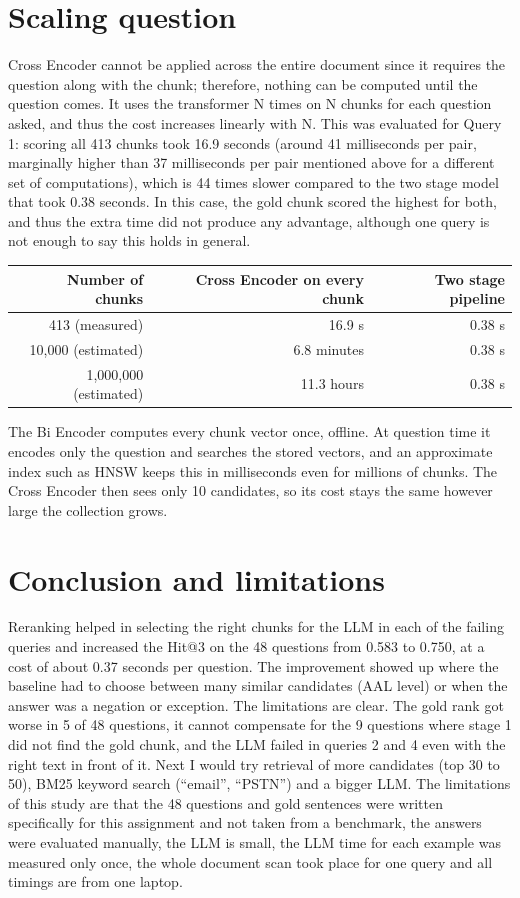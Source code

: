 \documentclass[11pt,a4paper]{article}
\begin{document}
\section{Scaling question}

Cross Encoder cannot be applied across the entire document since it requires the question along with the chunk; therefore, nothing can be computed until the question comes. It uses the transformer N times on N chunks for each question asked, and thus the cost increases linearly with N. This was evaluated for Query 1: scoring all 413 chunks took 16.9 seconds (around 41 milliseconds per pair, marginally higher than 37 milliseconds per pair mentioned above for a different set of computations), which is 44 times slower compared to the two stage model that took 0.38 seconds. In this case, the gold chunk scored the highest for both, and thus the extra time did not produce any advantage, although one query is not enough to say this holds in general.

\begin{center}
\small
\begin{tabular}{@{}rrr@{}}
\toprule
Number of chunks & Cross Encoder on every chunk & Two stage pipeline \\
\midrule
413 (measured) & 16.9 s & 0.38 s \\
10,000 (estimated) & 6.8 minutes & 0.38 s \\
1,000,000 (estimated) & 11.3 hours & 0.38 s \\
\bottomrule
\end{tabular}
\end{center}

The Bi Encoder computes every chunk vector once, offline. At question time it encodes only the question and searches the stored vectors, and an approximate index such as HNSW keeps this in milliseconds even for millions of chunks. The Cross Encoder then sees only 10 candidates, so its cost stays the same however large the collection grows.

\section{Conclusion and limitations}

Reranking helped in selecting the right chunks for the LLM in each of the failing queries and increased the Hit@3 on the
48 questions from 0.583 to 0.750, at a cost of about 0.37 seconds per question. The improvement showed up where the
baseline had to choose between many similar candidates (AAL level) or when the answer was a negation or exception. The limitations are clear. The gold rank got worse in 5 of 48 questions, it cannot compensate for the 9 questions where stage 1 did
not find the gold chunk, and the LLM failed in queries 2 and 4 even with the right text in front of it. Next I would try
retrieval of more candidates (top 30 to 50), BM25 keyword search (``email'', ``PSTN'') and a bigger LLM.
The limitations of this study are that the 48 questions and gold sentences were written specifically for this assignment and not taken from a benchmark,
the answers were evaluated manually, the LLM is small, the LLM time for each example was measured only once, the
whole document scan took place for one query and all timings are from one laptop.
\end{document}
